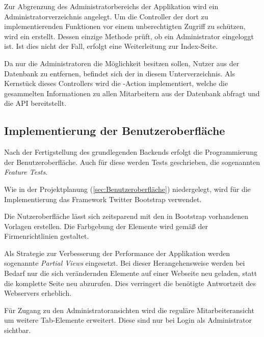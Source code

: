 
Zur Abgrenzung des Administratorbereichs der Applikation wird ein Administratorverzeichnis angelegt.
Um die Controller der dort zu implementierenden Funktionen vor einem unberechtigten Zugriff zu schützen, wird ein
 erstellt. Dessen einzige Methode prüft, ob ein Administrator eingeloggt ist.
Ist dies nicht der Fall, erfolgt eine Weiterleitung zur Index-Seite.

Da nur die Administratoren die Möglichkeit besitzen sollen, Nutzer aus der Datenbank zu entfernen,
befindet sich der  in diesem Unterverzeichnis. Als Kernstück dieses
Controllers wird die -Action implementiert, welche die gesammelten Informationen
zu allen Mitarbeitern aus der Datenbank abfragt und die API bereitstellt.


\subsection{Implementierung der Benutzeroberfläche}
\label{sec:Implementierung der Benutzeroberfläche}
Nach der Fertigstellung des grundlegenden Backends erfolgt die Programmierung der Benutzeroberfläche.
Auch für diese werden Tests geschrieben, die sogenannten \textit{Feature Tests}.


Wie in der Projektplanung (\Vgl \ref{sec:Benutzeroberfläche}) niedergelegt, wird für die Implementierung
das Framework Twitter Bootstrap verwendet.

Die Nutzeroberfläche lässt sich zeitsparend mit den in Bootstrap vorhandenen Vorlagen erstellen. Die Farbgebung der Elemente wird gemäß der
Firmenrichtlinien gestaltet.


Als Strategie zur Verbesserung der Performance der Applikation werden sogenannte
\textit{Partial Views} eingesetzt. Bei dieser Herangehensweise werden bei Bedarf nur die sich
verändernden Elemente auf einer Webseite neu geladen, statt die komplette Seite neu abzurufen.
Dies verringert die benötigte Antwortzeit des Webservers erheblich.

Für Zugang zu den Administratoransichten wird die reguläre Mitarbeiteransicht um weitere Tab-Elemente
erweitert. Diese sind nur bei Login als Administrator sichtbar.

